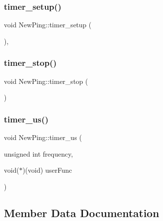 \subsubsection{\texorpdfstring{timer\+\_\+setup()}{timer\_setup()}}
{\footnotesize\ttfamily void New\+Ping\+::timer\+\_\+setup (\begin{DoxyParamCaption}{ }\end{DoxyParamCaption})\hspace{0.3cm}{\ttfamily [static]}, {\ttfamily [private]}}

\mbox{\label{class_new_ping_a58e3e7f80918b56235b5c783d2ecea50}} 
\subsubsection{\texorpdfstring{timer\+\_\+stop()}{timer\_stop()}}
{\footnotesize\ttfamily void New\+Ping\+::timer\+\_\+stop (\begin{DoxyParamCaption}{ }\end{DoxyParamCaption})\hspace{0.3cm}{\ttfamily [static]}}

\mbox{\label{class_new_ping_a14c3a18861179c75dc04a819728d8140}} 
\subsubsection{\texorpdfstring{timer\+\_\+us()}{timer\_us()}}
{\footnotesize\ttfamily void New\+Ping\+::timer\+\_\+us (\begin{DoxyParamCaption}\item[{unsigned int}]{frequency,  }\item[{void($\ast$)(void)}]{user\+Func }\end{DoxyParamCaption})\hspace{0.3cm}{\ttfamily [static]}}



\subsection{Member Data Documentation}
\mbox{\label{class_new_ping_a0d36ad3bdb5cdc14fba6fee0d99286b9}} 
